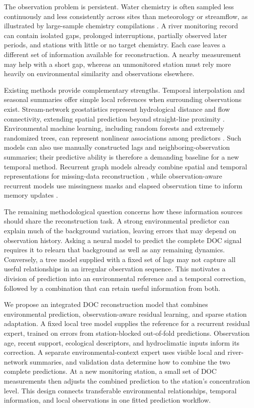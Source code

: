 \documentclass[11pt]{article}
\begin{document}
The observation problem is persistent. Water chemistry is often sampled less continuously and less consistently across sites than meteorology or streamflow, as illustrated by large-sample chemistry compilations \citep{sterle2024}. A river monitoring record can contain isolated gaps, prolonged interruptions, partially observed later periods, and stations with little or no target chemistry. Each case leaves a different set of information available for reconstruction. A nearby measurement may help with a short gap, whereas an unmonitored station must rely more heavily on environmental similarity and observations elsewhere.

Existing methods provide complementary strengths. Temporal interpolation and seasonal summaries offer simple local references when surrounding observations exist. Stream-network geostatistics represent hydrological distance and flow connectivity, extending spatial prediction beyond straight-line proximity \citep{verhoef2006}. Environmental machine learning, including random forests and extremely randomized trees, can represent nonlinear associations among predictors \citep{breiman2001,geurts2006}. Such models can also use manually constructed lags and neighboring-observation summaries; their predictive ability is therefore a demanding baseline for a new temporal method. Recurrent graph models already combine spatial and temporal representations for missing-data reconstruction \citep{cini2022}, while observation-aware recurrent models use missingness masks and elapsed observation time to inform memory updates \citep{che2018}.

The remaining methodological question concerns how these information sources should share the reconstruction task. A strong environmental predictor can explain much of the background variation, leaving errors that may depend on observation history. Asking a neural model to predict the complete DOC signal requires it to relearn that background as well as any remaining dynamics. Conversely, a tree model supplied with a fixed set of lags may not capture all useful relationships in an irregular observation sequence. This motivates a division of prediction into an environmental reference and a temporal correction, followed by a combination that can retain useful information from both.

We propose an integrated DOC reconstruction model that combines environmental prediction, observation-aware residual learning, and sparse station adaptation. A fixed local tree model supplies the reference for a recurrent residual expert, trained on errors from station-blocked out-of-fold predictions. Observation age, recent support, ecological descriptors, and hydroclimatic inputs inform its correction. A separate environmental-context expert uses visible local and river-network summaries, and validation data determine how to combine the two complete predictions. At a new monitoring station, a small set of DOC measurements then adjusts the combined prediction to the station's concentration level. This design connects transferable environmental relationships, temporal information, and local observations in one fitted prediction workflow.
\end{document}

